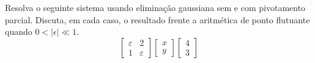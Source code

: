\begin{ex} Resolva o seguinte sistema usando eliminação gaussiana sem e com pivotamento parcial. Discuta, em cada caso, o resultado frente a aritmética de ponto flutuante quando $0<|\epsilon| \ll 1$.
  \begin{equation*}
    \begin{bmatrix}
      \varepsilon & 2\\
      1 & \varepsilon      
    \end{bmatrix}
    \begin{bmatrix}
      x\\y
    \end{bmatrix}
    \begin{bmatrix}
      4\\3
    \end{bmatrix}
  \end{equation*}
\end{ex}

